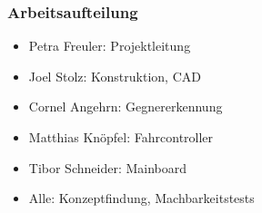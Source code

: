 \begin{frame}
	\frametitle{Arbeitsaufteilung}
	
	\begin{itemize}
	   	\item Petra Freuler: Projektleitung %
	   	\item Joel Stolz: Konstruktion, CAD	%
	   	\item Cornel Angehrn: Gegnererkennung 
	   	\item Matthias Knöpfel: Fahrcontroller
	   	\item Tibor Schneider: Mainboard
	\end{itemize}
	
	\begin{itemize}
	   	\item Alle: Konzeptfindung, Machbarkeitstests
	\end{itemize}
	

\end{frame}